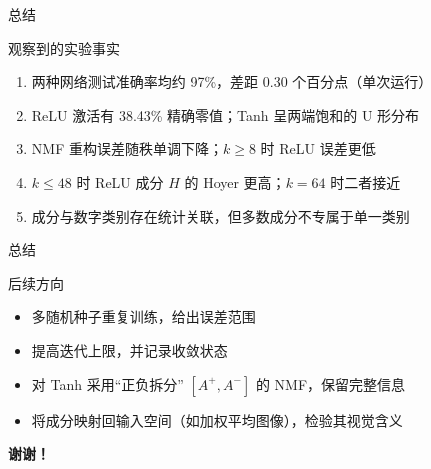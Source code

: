 \documentclass[UTF8,10pt,aspectratio=169]{ctexbeamer}
\begin{document}
\begin{frame}{总结}
\centering
\begin{minipage}{0.9\textwidth}
\begin{block}{观察到的实验事实}
\small
\begin{enumerate}\setlength{\itemsep}{0.25em}
  \item 两种网络测试准确率均约 97\%，差距 0.30 个百分点（单次运行）
  \item ReLU 激活有 38.43\% 精确零值；Tanh 呈两端饱和的 U 形分布
  \item NMF 重构误差随秩单调下降；$k\ge8$ 时 ReLU 误差更低
  \item $k\le48$ 时 ReLU 成分 $H$ 的 Hoyer 更高；$k=64$ 时二者接近
  \item 成分与数字类别存在统计关联，但多数成分不专属于单一类别
\end{enumerate}
\end{block}
\end{minipage}
\end{frame}

\begin{frame}{总结}
\centering
\begin{minipage}{0.9\textwidth}
\begin{block}{后续方向}
\small
\begin{itemize}\setlength{\itemsep}{0.3em}
  \item 多随机种子重复训练，给出误差范围
  \item 提高迭代上限，并记录收敛状态
  \item 对 Tanh 采用“正负拆分” $[A^+, A^-]$ 的 NMF，保留完整信息
  \item 将成分映射回输入空间（如加权平均图像），检验其视觉含义
\end{itemize}
\end{block}

\vspace{0.6em}
\centering
{\color{navy}\bfseries 谢谢！}
\end{minipage}
\end{frame}
\end{document}

